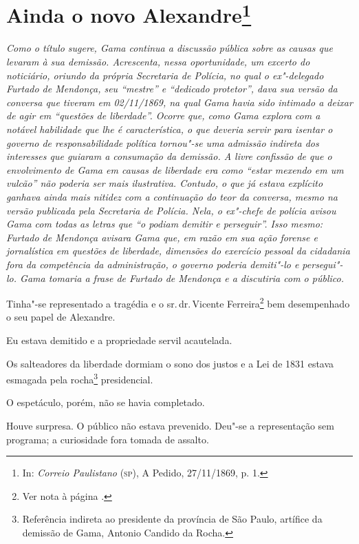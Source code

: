\chapter{Ainda o novo Alexandre\footnote[*]{In: \emph{Correio
  Paulistano} (\textsc{sp}), A Pedido, 27/11/1869, p. 1.}}

\begin{flushleft}
{\footnotesize\itshape
Como o título sugere, Gama continua a discussão pública sobre as
causas que levaram à sua demissão. Acrescenta, nessa oportunidade, um
excerto do noticiário, oriundo da própria Secretaria de Polícia, no qual
o ex"-delegado Furtado de Mendonça, seu ``mestre'' e ``dedicado protetor'',
dava sua versão da conversa que tiveram em 02/11/1869, na qual Gama
havia sido intimado a deixar de agir em ``questões de liberdade''. Ocorre
que, como Gama explora com a notável habilidade que lhe é
característica, o que deveria servir para isentar o governo de
responsabilidade política tornou"-se uma admissão indireta dos
interesses que guiaram a consumação da demissão. A livre confissão de
que o envolvimento de Gama em causas de liberdade era como ``estar
mexendo em um vulcão'' não poderia ser mais ilustrativa. Contudo, o que
já estava explícito ganhava ainda mais nitidez com a continuação do teor
da conversa, mesmo na versão publicada pela Secretaria de Polícia. Nela,
o ex"-chefe de polícia avisou Gama com todas as letras que ``o podiam
demitir e perseguir''. Isso mesmo: Furtado de Mendonça avisara Gama que,
em razão em sua ação forense e jornalística em questões de liberdade,
dimensões do exercício pessoal da cidadania fora da competência da
administração, o governo poderia demiti"-lo e persegui"-lo. Gama tomaria a
frase de Furtado de Mendonça e a discutiria com o público.}
\end{flushleft}

\noindent{}Tinha"-se representado a tragédia e o sr.\,dr.\,Vicente Ferreira\footnote{Ver nota à página \pageref{bueno}.} bem desempenhado o seu
papel de Alexandre.

Eu estava demitido e a propriedade servil acautelada.

Os salteadores da liberdade dormiam o sono dos justos e a Lei de 1831
estava esmagada pela rocha\footnote{Referência indireta ao presidente
  da província de São Paulo, artífice da demissão de Gama, Antonio
  Candido da Rocha.} presidencial.

O espetáculo, porém, não se havia completado.

Houve surpresa. O público não estava prevenido. Deu"-se a representação
sem programa; a curiosidade fora tomada de assalto.

